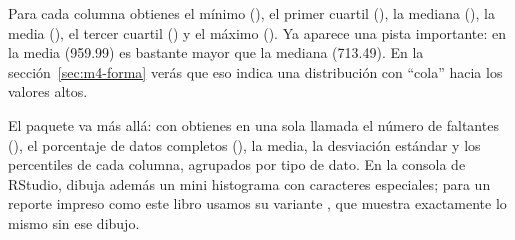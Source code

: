 Para cada columna obtienes el mínimo (), el primer cuartil
(), la mediana (), la media (), el
tercer cuartil () y el máximo (). Ya aparece una
pista importante: en  la media (959.99) es bastante
mayor que la mediana (713.49). En la sección~\ref{sec:m4-forma} verás que eso
indica una distribución con ``cola'' hacia los valores altos.

El paquete  va más allá: con  obtienes en una
sola llamada el número de faltantes (), el porcentaje de
datos completos (), la media, la desviación estándar y
los percentiles de cada columna, agrupados por tipo de dato. En la consola de
RStudio,  dibuja además un mini histograma con caracteres
especiales; para un reporte impreso como este libro usamos su variante
, que muestra exactamente lo mismo sin ese
dibujo.

